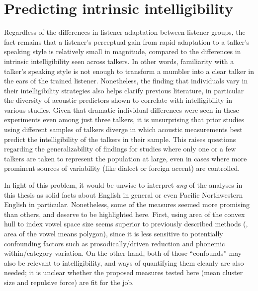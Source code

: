 \section{Predicting intrinsic intelligibility}
Regardless of the differences in listener adaptation between listener groups, the fact remains that a listener’s perceptual gain from rapid adaptation to a talker’s speaking style is relatively small in magnitude, compared to the differences in intrinsic intelligibility seen across talkers.  In other words, familiarity with a talker’s speaking style is not enough to transform a mumbler into a clear talker in the ears of the trained listener.  
Nonetheless, the finding that individuals vary in their intelligibility strategies also helps clarify previous literature, in particular the diversity of acoustic predictors shown to correlate with intelligibility in various studies.  Given that dramatic individual differences were seen in these experiments even among just three talkers, it is unsurprising that prior studies using different samples of talkers diverge in which acoustic measurements best predict the intelligibility of the talkers in their sample.  This raises questions regarding the generalizability of findings for studies where only one or a few talkers are taken to represent the population at large, even in cases where more prominent sources of variability (like dialect or foreign accent) are controlled.

In light of this problem, it would be unwise to interpret \emph{any} of the \ph{} analyses in this thesis as solid facts about English in general or even Pacific Northwestern English in particular.  Nonetheless, some of the measures seemed more promising than others, and deserve to be highlighted here.  First, using area of the convex hull to index vowel space size seems superior to previously described methods (\eg, area of the vowel means polygon), since it is less sensitive to potentially confounding factors such as prosodically\-/driven reduction and phonemic within\-/category variation.  On the other hand, both of those “confounds” may also be relevant to intelligibility, and ways of quantifying them cleanly are also needed; it is unclear whether the proposed measures tested here (mean cluster size and repulsive force) are fit for the job.

